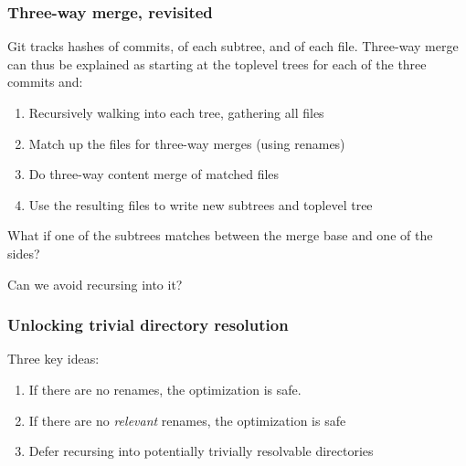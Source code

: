 \documentclass[compress,t]{beamer}
\begin{document}
\begin{frame}
  \frametitle{Three-way merge, revisited}

  Git tracks hashes of commits, of each subtree, and of each file.
  Three-way merge can thus be explained as starting at the toplevel
  trees for each of the three commits and:
  
  \begin{enumerate}[<+(1)->]
    \item Recursively walking into each tree, gathering all files
    \item Match up the files for three-way merges (using renames)
    \item Do three-way content merge of matched files
    \item Use the resulting files to write new subtrees and toplevel tree
  \end{enumerate}

  \pause
  \vspace*{\baselineskip}
  What if one of the subtrees matches between the merge base and one of the
  sides?

  \pause
  \vspace*{\baselineskip}
  Can we avoid recursing into it?

\end{frame}


\begin{frame}
  \frametitle{Unlocking trivial directory resolution}

  Three key ideas:
  \begin{enumerate}[<+(1)->]
    \item If there are no renames, the optimization is safe.
    \item If there are no \textit{relevant} renames, the optimization is safe
    \item Defer recursing into potentially trivially resolvable directories
  \end{enumerate}

\end{frame}

\end{document}
